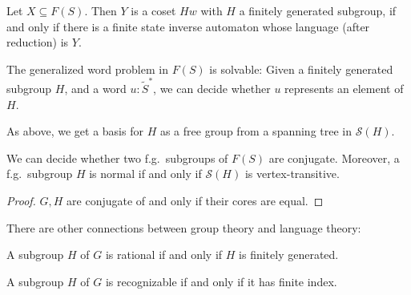\begin{theorem}
  Let $X \subseteq F(S)$. Then $Y$ is a coset $Hw$ with $H$
  a finitely generated subgroup,
  if and only if
  there is a finite state inverse automaton whose language (after reduction)
  is $Y$.
\end{theorem}

\begin{corollary}
  The generalized word problem in $F(S)$ is solvable:
  Given a finitely generated subgroup $H$, and a word $u : \tilde S^*$,
  we can decide whether $u$ represents an element of $H$.
\end{corollary}

As above, we get a basis for $H$ as a free group from a spanning tree in
$\mathcal{S}(H)$.

\begin{theorem}
  We can decide whether two f.g.\ subgroups of $F(S)$ are conjugate.
  Moreover, a f.g.\ subgroup $H$ is normal if and only if $\mathcal{S}(H)$
  is vertex-transitive.
\end{theorem}
\begin{proof}
  $G,H$ are conjugate of and only if their cores are equal.
\end{proof}

There are other connections between group theory and language theory:
\begin{theorem}
  A subgroup $H$ of $G$ is rational if and only if $H$ is finitely generated.
\end{theorem}
\begin{theorem}
  A subgroup $H$ of $G$ is recognizable if and only if it has finite index.
\end{theorem}
